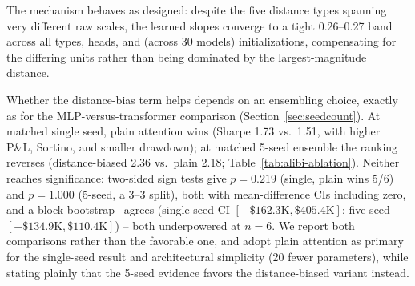 \documentclass[sigconf,review,anonymous]{acmart}
\begin{document}
The mechanism behaves as designed: despite the five distance types spanning very different raw scales, the learned slopes converge to a tight 0.26--0.27 band across all types, heads, and (across 30 models) initializations, compensating for the differing units rather than being dominated by the largest-magnitude distance.

Whether the distance-bias term helps depends on an ensembling choice, exactly as for the MLP-versus-transformer comparison (Section~\ref{sec:seedcount}). At matched single seed, plain attention wins (Sharpe 1.73 vs.\ 1.51, with higher P\&L, Sortino, and smaller drawdown); at matched 5-seed ensemble the ranking reverses (distance-biased 2.36 vs.\ plain 2.18; Table~\ref{tab:alibi-ablation}). Neither reaches significance: two-sided sign tests give $p=0.219$ (single, plain wins 5/6) and $p=1.000$ (5-seed, a 3--3 split), both with mean-difference CIs including zero, and a block bootstrap~\cite{kunsch1989} agrees (single-seed CI $[-\$162.3\text{K}, \$405.4\text{K}]$; five-seed $[-\$134.9\text{K}, \$110.4\text{K}]$) -- both underpowered at $n=6$. We report both comparisons rather than the favorable one, and adopt plain attention as primary for the single-seed result and architectural simplicity (20 fewer parameters), while stating plainly that the 5-seed evidence favors the distance-biased variant instead.

\begin{table}[t]
\centering
\footnotesize
{}
\caption{Matched seed-count comparison, identical protocol otherwise (same features, folds, val-loss checkpointing, calibration, and $p\ge0.5$ selection rule): plain attention wins at single-seed, the distance-biased variant wins at 5-seed ensemble, and neither difference is statistically significant (main text).}
\label{tab:alibi-ablation}
\end{table}
\end{document}
